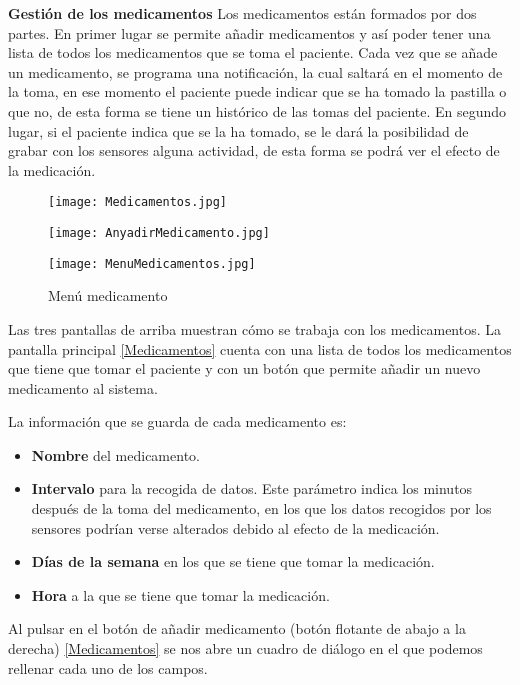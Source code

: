 \documentclass[11pt,spanish]{article}
\begin{document}
{\bf Gestión de los medicamentos}
\newline
\newline
Los medicamentos están formados por dos partes. En primer lugar se permite añadir medicamentos y así poder tener una lista de todos los medicamentos que se toma el paciente. Cada vez que se añade un medicamento, se programa una notificación, la cual saltará en el momento de la toma, en ese momento el paciente puede indicar que se ha tomado la pastilla o que no, de esta forma se tiene un histórico de las tomas del paciente. En segundo lugar, si el paciente indica que se la ha tomado, se le dará la posibilidad de grabar con los sensores alguna actividad, de esta forma se podrá ver el efecto de la medicación.
\begin{figure}[!htb]
  \texttt{[image: Medicamentos.jpg]}
  \caption{Medicamentos}
  \label{Medicamentos}
\endminipage\hfill
{}
  \texttt{[image: AnyadirMedicamento.jpg]}
  \caption{Añadir medicamento}
  \label{Añadir medicamento}
\endminipage\hfill
{}%
  \texttt{[image: MenuMedicamentos.jpg]}
  \caption{Menú medicamento}
  \label{Menú medicamento}
\endminipage
\end{figure}

Las tres pantallas de arriba muestran cómo se trabaja con los medicamentos. La pantalla principal \ref{Medicamentos} cuenta con una lista de todos los medicamentos que tiene que tomar el paciente y con un botón que permite añadir un nuevo medicamento al sistema.
\newline

La información que se guarda de cada medicamento es:

\begin{itemize}
	\item {\bf Nombre} del medicamento.
	\item {\bf Intervalo} para la recogida de datos. Este parámetro indica los minutos después de la toma del medicamento, en los que los datos recogidos por los sensores podrían verse alterados debido al efecto de la medicación.
	\item {\bf Días de la semana} en los que se tiene que tomar la medicación.
	\item {\bf Hora} a la que se tiene que tomar la medicación.
\end{itemize}

Al pulsar en el botón de añadir medicamento (botón flotante de abajo a la derecha) \ref{Medicamentos} se nos abre un cuadro de diálogo en el que podemos rellenar cada uno de los campos.
\newline
\end{document}
